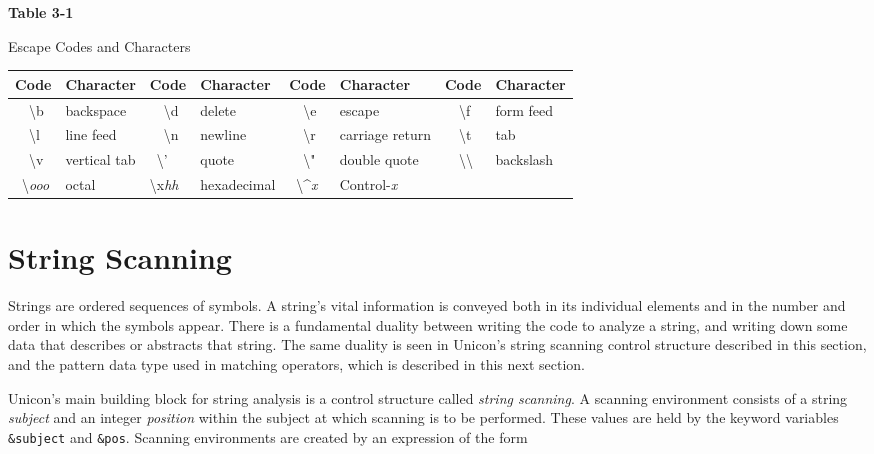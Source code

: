 \medskip

\begin{center}
{\sffamily\bfseries
Table 3-1

Escape Codes and Characters 
}
\end{center}

\begin{center}
\begin{xtabular}{|m{0.38in}|m{0.8in}|m{0.4in}|m{0.855in}|m{0.38in}|m{1.14in}|m{0.38in}|m{0.68in}|}
\hline
\sffamily\bfseries Code &
\sffamily\bfseries Character &
\sffamily\bfseries Code &
\sffamily\bfseries Character &
\sffamily\bfseries Code &
\sffamily\bfseries Character &
\sffamily\bfseries Code &
\sffamily\bfseries Character\\\hline
\ \ {\textbackslash}b &
backspace &
\ \ {\textbackslash}d &
delete &
\ \ {\textbackslash}e &
escape &
\ \ {\textbackslash}f &
form feed\\\hline
\ \ {\textbackslash}l &
line feed &
\ \ {\textbackslash}n &
newline &
\ \ {\textbackslash}r &
carriage return &
\ \ {\textbackslash}t &
tab\\\hline
\ \ {\textbackslash}v &
vertical tab &
\ {\textbackslash}' &
quote &
\ \ {\textbackslash}" &
double quote &
\ \ {\textbackslash}{\textbackslash} &
backslash\\\hline
\ {\textbackslash}\textit{ooo} &
octal &
{\textbackslash}x\textit{hh} &
hexadecimal  &
\ {\textbackslash}\^{}\textit{x} &
Control-\textit{x} &
~
 &
~
\\\hline
\end{xtabular}
\end{center}

\section{String Scanning}

Strings are ordered sequences of symbols. A string's vital information
is conveyed both in its individual elements and in
the number and order in which the symbols appear.
There is a fundamental duality between writing the code to analyze a
string, and writing down some data that describes or abstracts
that string. The same duality is seen in Unicon's string scanning
control structure described in this section, and the pattern data type
used in matching operators, which is described in this next section.

Unicon's main building block for string analysis is a control
structure called \textit{string scanning}. A
scanning environment consists of a string
\textit{subject} and an
integer \textit{position} within the subject at
which scanning is to be performed. These values are held by the keyword
variables \texttt{\&subject} and \texttt{\&pos}. Scanning environments
are created by an expression of the form

